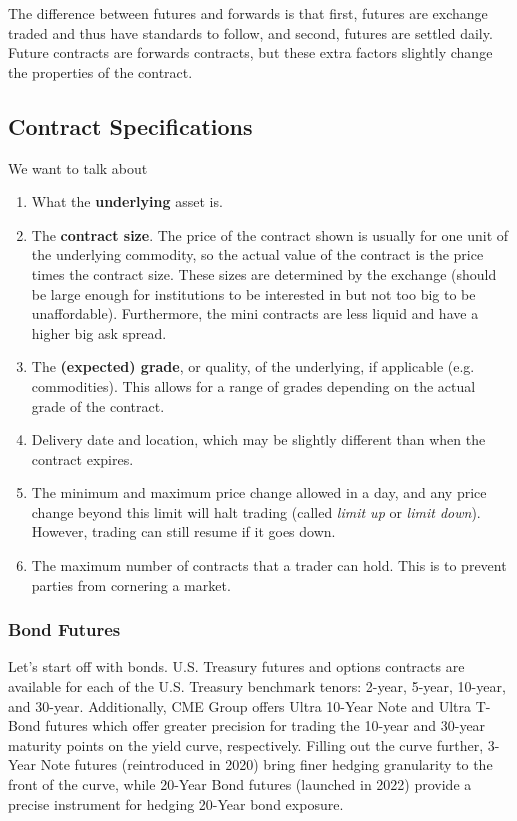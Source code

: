 \documentclass{article}
\begin{document}
  The difference between futures and forwards is that first, futures are exchange traded and thus have standards to follow, and second, futures are settled daily. Future contracts are forwards contracts, but these extra factors slightly change the properties of the contract. 

  \subsection{Contract Specifications}

      We want to talk about 
      \begin{enumerate}
        \item What the \textbf{underlying} asset is. 

        \item The \textbf{contract size}. The price of the contract shown is usually for one unit of the underlying commodity, so the actual value of the contract is the price times the contract size. These sizes are determined by the exchange (should be large enough for institutions to be interested in but not too big to be unaffordable). Furthermore, the mini contracts are less liquid and have a higher big ask spread. 

        \item The \textbf{(expected) grade}, or quality, of the underlying, if applicable (e.g. commodities). This allows for a range of grades depending on the actual grade of the contract.  

        \item Delivery date and location, which may be slightly different than when the contract expires. 

        \item The minimum and maximum price change allowed in a day, and any price change beyond this limit will halt trading (called \textit{limit up} or \textit{limit down}). However, trading can still resume if it goes down. 

        \item The maximum number of contracts that a trader can hold. This is to prevent parties from cornering a market. 
      \end{enumerate}

    \subsubsection{Bond Futures}
      Let's start off with bonds. U.S. Treasury futures and options contracts are available for each of the U.S. Treasury benchmark tenors: 2-year, 5-year, 10-year, and 30-year. Additionally, CME Group offers Ultra 10-Year Note and Ultra T-Bond futures which offer greater precision for trading the 10-year and 30-year maturity points on the yield curve, respectively. Filling out the curve further, 3-Year Note futures (reintroduced in 2020) bring finer hedging granularity to the front of the curve, while 20-Year Bond futures (launched in 2022) provide a precise instrument for hedging 20-Year bond exposure. 
\end{document}
